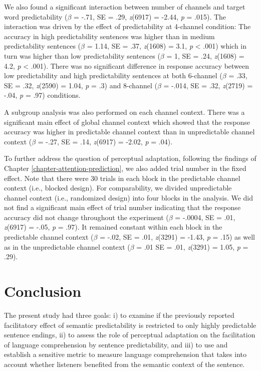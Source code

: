 \documentclass[a4paper, nobind]{templates/ociamthesis}
\begin{document}
We also found a significant interaction between number of channels and target word predictability
(\(\beta\) = -.71, SE = .29, \emph{z}(6917) = -2.44, \emph{p} = .015).
The interaction was driven by the effect of predictability at 4-channel condition:
The accuracy in high predictability sentences was higher than in medium predictability sentences
(\(\beta\) = 1.14, SE = .37, \emph{z}(1608) = 3.1, \emph{p} \textless{} .001) which in turn was higher than low predictability sentences
(\(\beta\) = 1, SE = .24, \emph{z}(1608) = 4.2, \emph{p} \textless{} .001).
There was no significant difference in response accuracy between low predictability and high predictability sentences
at both 6-channel (\(\beta\) = .33, SE = .32, \emph{z}(2590) = 1.04, \emph{p} = .3)
and 8-channel (\(\beta\) = -.014, SE = .32, \emph{z}(2719) = -.04, \emph{p} = .97) conditions.

A subgroup analysis was also performed on each channel context.
There was a significant main effect of global channel context which showed that the response accuracy was higher in predictable channel context than in unpredictable channel context (\(\beta\) = -.27, SE = .14, \emph{z}(6917) = -2.02, \emph{p} = .04).

To further address the question of perceptual adaptation, following the findings of Chapter \ref{chapter-attention-prediction}, we also added trial number in the fixed effect.
Note that there were 30 trials in each block in the predictable channel context (i.e., blocked design).
For comparability, we divided unpredictable channel context (i.e., randomized design) into four blocks in the analysis.
We did not find a significant main effect of trial number indicating that the response accuracy did not change throughout the experiment (\(\beta\) = -.0004, SE = .01, \emph{z}(6917) = -.05, \emph{p} = .97).
It remained constant within each block in the predictable channel context (\(\beta\) = -.02, SE = .01, \emph{z}(3291) = -1.43, \emph{p} = .15) as well as in the unpredictable channel context (\(\beta\) = .01 SE = .01, \emph{z}(3291) = 1.05, \emph{p} = .29).

\hypertarget{conclusion-1}{%
\section{Conclusion}\label{conclusion-1}}

The present study had three goals: i) to examine if the previously reported facilitatory effect of semantic predictability is restricted to only highly predictable sentence endings,
ii) to assess the role of perceptual adaptation on the facilitation of language comprehension by sentence predictability, and
iii) to use and establish a sensitive metric to measure language comprehension that takes into account whether listeners benefited from the semantic context of the sentence.
\end{document}
